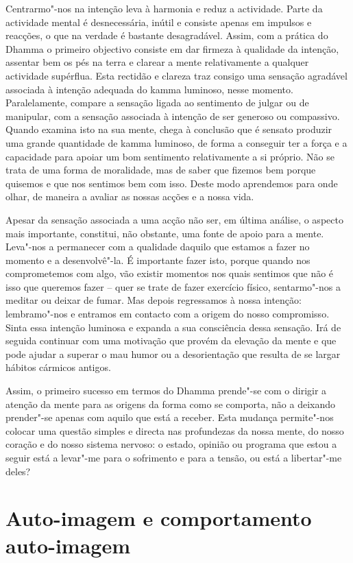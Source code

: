 Centrarmo"-nos na intenção leva à harmonia e reduz a actividade. Parte da
actividade mental é desnecessária, inútil e consiste apenas em impulsos e
reacções, o que na verdade é bastante desagradável. Assim, com a prática do
Dhamma o primeiro objectivo consiste em dar firmeza à qualidade da intenção,
assentar bem os pés na terra e clarear a mente relativamente a qualquer
actividade supérflua. Esta rectidão e clareza traz consigo uma sensação
agradável associada à intenção adequada do kamma luminoso, nesse momento.
Paralelamente, compare a sensação ligada ao sentimento de julgar ou de
manipular, com a sensação associada à intenção de ser generoso ou compassivo.
Quando examina isto na sua mente, chega à conclusão que é sensato produzir uma
grande quantidade de kamma luminoso, de forma a conseguir ter a força e a
capacidade para apoiar um bom sentimento relativamente a si próprio. Não se
trata de uma forma de moralidade, mas de saber que fizemos bem porque quisemos e
que nos sentimos bem com isso. Deste modo aprendemos para onde olhar, de maneira
a avaliar as nossas acções e a nossa vida.

Apesar da sensação associada a uma acção não ser, em última análise, o aspecto
mais importante, constitui, não obstante, uma fonte de apoio para a mente.
Leva"-nos a permanecer com a qualidade daquilo que estamos a fazer no momento e
a desenvolvê"-la. É importante fazer isto, porque quando nos comprometemos com
algo, vão existir momentos nos quais sentimos que não é isso que queremos fazer
-- quer se trate de fazer exercício físico, sentarmo"-nos a meditar ou deixar de
fumar. Mas depois regressamos à nossa intenção: lembramo"-nos e entramos em
contacto com a origem do nosso compromisso. Sinta essa intenção luminosa e
expanda a sua consciência dessa sensação. Irá de seguida continuar com uma
motivação que provém da elevação da mente e que pode ajudar a superar o mau
humor ou a desorientação que resulta de se largar hábitos cármicos antigos.

Assim, o primeiro sucesso em termos do Dhamma prende"-se com o dirigir a atenção
da mente para as origens da forma como se comporta, não a deixando prender"-se
apenas com aquilo que está a receber. Esta mudança permite"-nos colocar uma
questão simples e directa nas profundezas da nossa mente, do nosso coração e do
nosso sistema nervoso: o estado, opinião ou programa que estou a seguir está a
levar"-me para o sofrimento e para a tensão, ou está a libertar"-me deles?

\section{Auto-imagem e comportamento auto-imagem}

